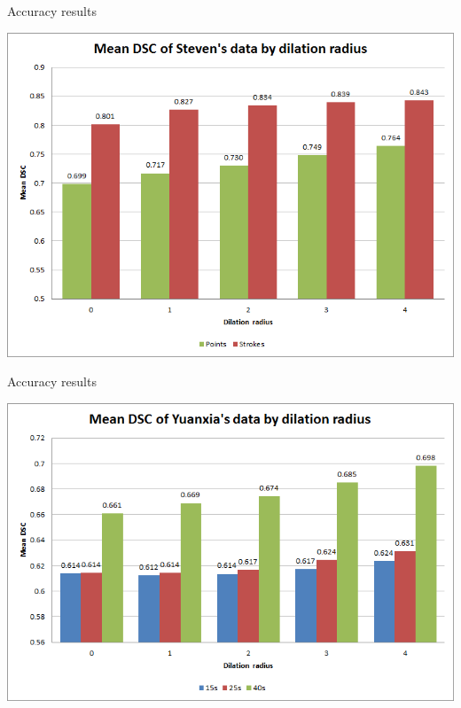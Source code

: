 \documentclass[14pt,xcolor=dvipsnames]{beamer}
\begin{document}
\begin{frame}[fragile,t]{Accuracy results}
	\begin{center}
		\includegraphics[width=\paperheight]{steven_mean_dsc}
	\end{center}
\end{frame}

\begin{frame}[fragile,t]{Accuracy results}
	\begin{center}
		\includegraphics[width=\paperheight]{yuanxia_mean_dsc}
	\end{center}
\end{frame}
\end{document}
